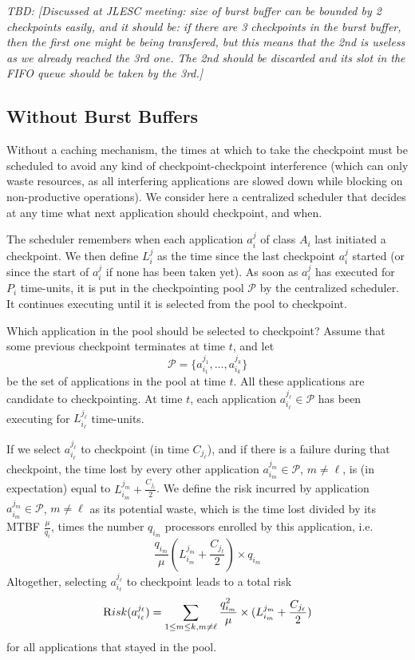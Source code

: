 \documentclass{article}
\newcommand{\app}[1]{A_{#1}}
\newcommand{\application}[2]{a_{#1}^{#2}}
\newcommand{\nbnodes}[1]{q_{#1}}
\newcommand{\mtbfplat}{\mu}
\newcommand{\lastckpt}[2]{L_{#1}^{#2}}
\newcommand{\pool}{{\mathcal P}}
\newcommand{\risk}{{\textsc Risk}}
\newcommand{\todo}[1]{\textit{TBD: [#1]}}
\begin{document}
 \todo{Discussed at JLESC meeting: size of burst buffer can be
    bounded by 2 checkpoints easily, and it should be: if there are 3
    checkpoints in the burst buffer, then the first one might be being
    transfered, but this means that the 2nd is useless as we already
    reached the 3rd one. The 2nd should be discarded and its slot in
    the FIFO queue should be taken by the 3rd.}

\subsection{Without Burst Buffers}

Without a caching mechanism, the times at which to take the checkpoint
must be scheduled to avoid any kind of checkpoint-checkpoint
interference (which can only waste resources, as all interfering
applications are slowed down while blocking on non-productive
operations). We consider here a centralized scheduler that decides at
any time what next application should checkpoint, and when.

The scheduler remembers when each application $\application{i}{j}$ of class
$\app{i}$ last initiated a checkpoint. We then define $\lastckpt{i}{j}$
as the time since the last checkpoint $\application{i}{j}$ started
(or since the start of $\application{i}{j}$ if none has been taken yet). 
As soon as $\application{i}{j}$ has executed for $P_{i}$ time-units,
it is put in the checkpointing pool $\pool$ by the centralized scheduler. It 
continues executing until it is selected from the pool to checkpoint.

Which application in the pool should be selected to checkpoint?
Assume that some previous checkpoint terminates at time $t$,
and let 
$$\pool = \{ \application{i_{1}}{j_{1}}, \dots, \application{i_{k}}{j_{k}} \}$$
be the set of applications  in the pool at time $t$. All these applications are 
candidate to checkpointing. At time $t$, each application $\application{i_{\ell}}{j_{\ell}} \in \pool$
has been executing for  $\lastckpt{i_{\ell}}{j_{\ell}}$ time-units.

If we select $\application{i_{\ell}}{j_{\ell}}$ to checkpoint (in time $C_{j_{\ell}}$),
and if there is a failure during that checkpoint, the time lost by every other application
$\application{i_{m}}{j_{m}} \in \pool$, $m \neq \ell$, is (in expectation) equal to
 $\lastckpt{i_m}{j_m} + \frac{C_{j_{\ell}}}{2}$. 
We define the risk incurred by application
$\application{i_{m}}{j_{m}} \in \pool$, $m \neq \ell$
as its potential waste, which is the time lost divided by its MTBF $\frac{\mtbfplat}{\nbnodes{i}}$,
times the number $\nbnodes{i_m}$ processors enrolled by this application, i.e.
$$ \frac{\nbnodes{i_{m}}}{\mtbfplat}  (\lastckpt{i_m}{j_m} + \frac{C_{j_{\ell}}}{2})
\times \nbnodes{i_m} $$
Altogether, selecting $\application{i_{\ell}}{j_{\ell}}$ to checkpoint leads to a total risk
$$\risk(\application{i_{\ell}}{j_{\ell}}) = \sum_{1 \leq m \leq k, m \neq \ell} \frac{\nbnodes{i_{m}}^{2}}{\mtbfplat}  \times (\lastckpt{i_m}{j_m} + \frac{C_{j_{\ell}}}{2})$$
  for all applications that stayed in the pool.
  
\end{document}
